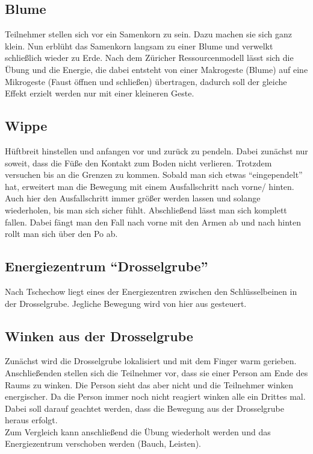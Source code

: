 \documentclass[ngerman, a4paper, twoside]{scrbook}%
\begin{document}
	\subsection{Blume}
	Teilnehmer stellen sich vor ein Samenkorn zu sein. Dazu machen sie sich ganz klein. Nun erblüht das Samenkorn langsam zu einer Blume und verwelkt schließlich wieder zu Erde. Nach dem Züricher Ressourcenmodell lässt sich die Übung und die Energie, die dabei entsteht von einer Makrogeste (Blume) auf eine Mikrogeste (Faust öffnen und schließen) übertragen, dadurch soll der gleiche Effekt erzielt werden nur mit einer kleineren Geste.
	\subsection{Wippe}  \label{subsec:Wippe}
	Hüftbreit hinstellen und anfangen vor und zurück zu pendeln. Dabei zunächst nur soweit, dass die Füße den Kontakt zum Boden nicht verlieren. Trotzdem versuchen bis an die Grenzen zu kommen. Sobald man sich etwas "`eingependelt"' hat, erweitert man die Bewegung mit einem Ausfallschritt nach vorne/ hinten. Auch hier den Ausfallschritt immer größer werden lassen und solange wiederholen, bis man sich sicher fühlt. Abschließend lässt man sich komplett fallen. Dabei fängt man den Fall nach vorne mit den Armen ab und nach hinten rollt man sich über den Po ab.
	\subsection{Energiezentrum "`Drosselgrube"'}
	Nach Tschechow liegt eines der Energiezentren zwischen den Schlüsselbeinen in der Drosselgrube. Jegliche Bewegung wird von hier aus gesteuert.
	\subsection{Winken aus der Drosselgrube}
	Zunächst wird die Drosselgrube lokalisiert und mit dem Finger warm gerieben. Anschließenden stellen sich die Teilnehmer vor, dass sie einer Person am Ende des Raums zu winken. Die Person sieht das aber nicht und die Teilnehmer winken energischer. Da die Person immer noch nicht reagiert winken alle ein Drittes mal. Dabei soll darauf geachtet werden, dass die Bewegung aus der Drosselgrube heraus erfolgt.\\
	Zum Vergleich kann anschließend die Übung wiederholt werden und das Energiezentrum verschoben werden (Bauch, Leisten).
\end{document}
